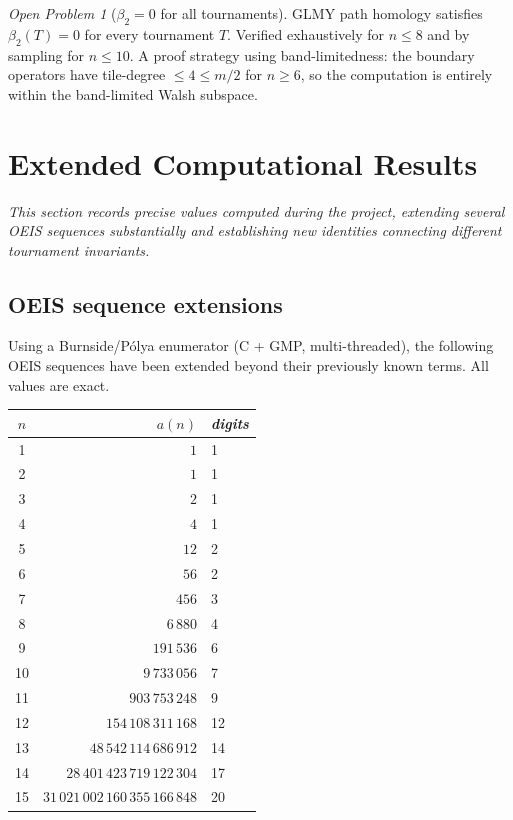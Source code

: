 \documentclass[12pt,reqno]{amsart}
\theoremstyle{plain}
\theoremstyle{definition}
\theoremstyle{remark}
\newtheorem{openquestion}[theorem]{Open Problem}
\begin{document}
\begin{openquestion}[$\beta_2 = 0$ for all tournaments]\label{oq:beta2}
GLMY path homology satisfies $\beta_2(T) = 0$ for every tournament $T$.
Verified exhaustively for $n \leq 8$ and by sampling for $n \leq 10$.
A proof strategy using band-limitedness: the boundary operators have tile-degree
$\leq 4 \leq m/2$ for $n \geq 6$, so the computation is entirely within the
band-limited Walsh subspace.
\end{openquestion}

\section{Extended Computational Results}
\label{sec:extended}

\noindent\textit{This section records precise values computed during the project, extending several OEIS sequences substantially and establishing new identities connecting different tournament invariants.}

\subsection{OEIS sequence extensions}

Using a Burnside/P\'{o}lya enumerator (C + GMP, multi-threaded), the following OEIS sequences have been extended beyond their previously known terms. All values are exact.

\begin{center}
\renewcommand{\arraystretch}{1.15}
\begin{tabular}{crl}
\hline
$n$ & $a(n)$ & \textit{digits} \\
\hline
1 & $1$ & 1 \\
2 & $1$ & 1 \\
3 & $2$ & 1 \\
4 & $4$ & 1 \\
5 & $12$ & 2 \\
6 & $56$ & 2 \\
7 & $456$ & 3 \\
8 & $6\,880$ & 4 \\
9 & $191\,536$ & 6 \\
10 & $9\,733\,056$ & 7 \\
11 & $903\,753\,248$ & 9 \\
12 & $154\,108\,311\,168$ & 12 \\
13 & $48\,542\,114\,686\,912$ & 14 \\
14 & $28\,401\,423\,719\,122\,304$ & 17 \\
15 & $31\,021\,002\,160\,355\,166\,848$ & 20 \\
\hline
\end{tabular}
\label{tab:a000568}
\end{center}
\end{document}
